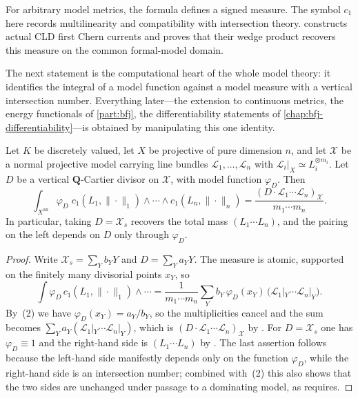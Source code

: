 \begin{remark}
\label{rem:metrics-model-measure-signed}
For arbitrary model metrics, the formula defines a signed measure. The
symbol $c_1$ here records multilinearity and compatibility with
intersection theory.  constructs actual CLD first Chern currents
and proves that their wedge product recovers this measure on the common
formal-model domain.
\end{remark}

The next statement is the computational heart of the whole model theory: it
identifies the integral of a model function against a model measure with a
vertical intersection number. Everything later---the extension to continuous
metrics, the energy functionals of \cref{part:bfj}, the differentiability
statements of \cref{chap:bfj-differentiability}---is obtained by
manipulating this one identity.

\begin{proposition}
\label{prop:metrics-cl-model-function-integral}
Let $K$ be discretely valued, let $X$ be projective of pure dimension
$n$, and let $\mathcal X$ be a normal projective model carrying line
bundles $\mathcal L_1,\ldots,\mathcal L_n$ with
$\mathcal L_i|_X\simeq L_i^{\otimes m_i}$. Let $D$ be a vertical
$\mathbf Q$-Cartier divisor on $\mathcal X$, with model function
$\varphi_D$. Then
\begin{equation}
\label{eq:metrics-cl-pairing}
 \int_{X^{\mathrm{an}}}\varphi_D\;
 c_1(L_1,\|\cdot\|_1)\wedge\cdots\wedge c_1(L_n,\|\cdot\|_n)
 =\frac{(D\cdot\mathcal L_1\cdots\mathcal L_n)_{\mathcal X}}
        {m_1\cdots m_n}.
\end{equation}
In particular, taking $D=\mathcal X_s$ recovers the total mass
$(L_1\cdots L_n)$, and the pairing on the left depends on $D$ only
through $\varphi_D$.
\end{proposition}

\begin{proof}
Write $\mathcal X_s=\sum_Yb_YY$ and $D=\sum_Ya_YY$. The measure is
atomic, supported on the finitely many divisorial points $x_Y$, so
\[
 \int\varphi_D\,c_1(L_1,\|\cdot\|_1)\wedge\cdots
 =\frac1{m_1\cdots m_n}\sum_Yb_Y\,\varphi_D(x_Y)\,
   \bigl(\mathcal L_1|_Y\cdots\mathcal L_n|_Y\bigr).
\]
By \,(2) we have
$\varphi_D(x_Y)=a_Y/b_Y$, so the multiplicities cancel and the sum becomes
$\sum_Ya_Y(\mathcal L_1|_Y\cdots\mathcal L_n|_Y)$, which is
$(D\cdot\mathcal L_1\cdots\mathcal L_n)_{\mathcal X}$ by
. For $D=\mathcal X_s$ one has
$\varphi_D\equiv1$ and the right-hand side is $(L_1\cdots L_n)$ by
. The last assertion follows because the
left-hand side manifestly depends only on the function $\varphi_D$, while
the right-hand side is an intersection number; combined with
\,(2) this also shows that the two
sides are unchanged under passage to a dominating model, as
 requires.
\end{proof}

